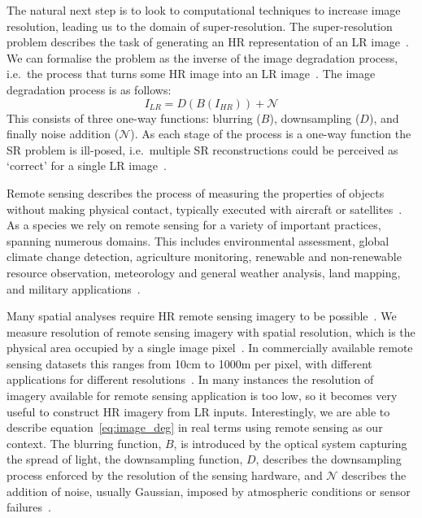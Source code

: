The natural next step is to look to computational techniques to increase image resolution, leading us to the domain of super-resolution. The super-resolution problem describes the task of generating an HR representation of an LR image~\cite{ref}. We can formalise the problem as the inverse of the image degradation process, i.e.\ the process that turns some HR image into an LR image~\cite{imageDeg}. The image degradation process is as follows:
\begin{equation}\label{eq:image_deg}
    I_{LR} = D(B(I_{HR})) + \mathcal{N}
\end{equation}
This consists of three one-way functions: blurring ($B$), downsampling ($D$), and finally noise addition ($\mathcal{N}$). As each stage of the process is a one-way function the SR problem is ill-posed, i.e.\ multiple SR reconstructions could be perceived as `correct' for a single LR image~\cite{ref}.

Remote sensing describes the process of measuring the properties of objects without making physical contact, typically executed with aircraft or satellites~\cite{remoteSensing,remoteSensingImageProcessing}. As a species we rely on remote sensing for a variety of important practices, spanning numerous domains. This includes environmental assessment, global climate change detection, agriculture monitoring, renewable and non-renewable resource observation, meteorology and general weather analysis, land mapping, and military applications~\cite{remoteSensingImageProcessing, remoteSensingUses, remoteSensingGANsReview}.

Many spatial analyses require HR remote sensing imagery to be possible~\cite{ref}. We measure resolution of remote sensing imagery with spatial resolution, which is the physical area occupied by a single image pixel~\cite{ref}. In commercially available remote sensing datasets this ranges from 10cm to 1000m per pixel, with different applications for different resolutions~\cite{remoteSensingImageProcessing}. In many instances the resolution of imagery available for remote sensing application is too low, so it becomes very useful to construct HR imagery from LR inputs. Interestingly, we are able to describe equation~\ref{eq:image_deg} in real terms using remote sensing as our context. The blurring function, $B$, is introduced by the optical system capturing the spread of light, the downsampling function, $D$, describes the downsampling process enforced by the resolution of the sensing hardware, and $\mathcal{N}$ describes the addition of noise, usually Gaussian, imposed by atmospheric conditions or sensor failures~\cite{superResRemoteSensingOverview,superResRemoteSensingChallenges, remoteSensingDeepLearningReview, remoteSensingGANsReview}.

